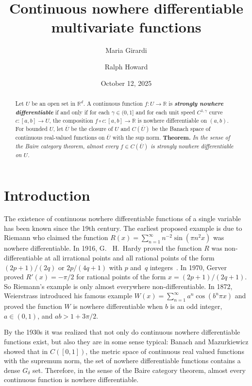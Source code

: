 \documentclass[12pt]{amsart}
\date{October 12, 2025}
\author{Maria Girardi}
\author{Ralph Howard}
\title[Nowhere differentiable multivariate functions]{Continuous nowhere 
  differentiable multivariate functions}
\numberwithin{equation}{section}
\newcommand{\bi}[1]{{\boldmath\textbf{\itshape{#1}}}} %
\newcommand{\R}{{\mathbb R}}		%
\newcommand{\cn}{\colon}                %
\theoremstyle{definition}
\theoremstyle{remark}
\begin{document}
\begin{abstract}
Let $U$ be an open set in $\R^d$.  A
continuous function $f\cn U \to \R $
is \bi{strongly nowhere differentiable}
 if and only if %
for each   $\gamma\in(0,1]$ and
for each unit speed $C^{1,\gamma}$ curve 
$c\cn [a,b] \to U$, 
the composition $f\circ c \cn [a,b] \to \R$
is nowhere differentiable on  $(a,b)$.
For bounded $U$, let
$\overline U$ be the closure of $U$ and
$C(\overline U)$ be the Banach space of continuous
real-valued functions on $\overline U$
with the sup %
norm.
\textbf{Theorem.}  \emph{In the sense of the  Baire category 
theorem, almost every $f\in C(\overline U)$ is strongly 
nowhere differentiable on $U$.}
\end{abstract}

\maketitle

\section{Introduction}
\label{sec:intro}


The existence of continuous nowhere differentiable functions of a single  
variable has been known since the 19th century.  The earliest proposed example
is due to Riemann who claimed the function
$R(x) = \sum_{n=1}^\infty n^{-2}\sin(\pi n^2 x)$
was nowhere differentiable. In 1916,
G.~ H.\ Hardy proved the  function $R$ was non-differentiable at
all irrational points and all rational points of the form $(2p+1)/(2q)$
or $2p/(4q+1)$ with $p$ and~$q$ integers~\cite{Hardy:Reim_fcn}.  In 1970,
Gerver \cite{Gerver70} proved $R'(x) = -\pi/2$ for rational points of the form
$x = (2p+1)/(2q+1)$.   So Riemann's example is  only almost everywhere
non-differentiable.    In 1872,  Weierstrass introduced his famous example
$W(x) =\sum_{n=1}^\infty a^n \cos(b^n \pi x) $ and proved  the
function $W$ is nowhere differentiable when  $b$ is an odd integer, 
$a\in (0,1)$, and $ab>1 + 3\pi/2$.



By the 1930s it was realized that not only do continuous nowhere
differentiable functions exist, but also they are in some sense typical:
Banach \cite{Banach31} and  Mazurkiewicz \cite{Mazurkiewicz}
showed that in $C([0,1])$,
the metric space of continuous real valued functions
with the supremum norm, the set of nowhere differentiable functions
contains a dense $G_\delta$ set.
Therefore, in the sense of the Baire category theorem,
almost every continuous function is nowhere differentiable.
 
\end{document}
